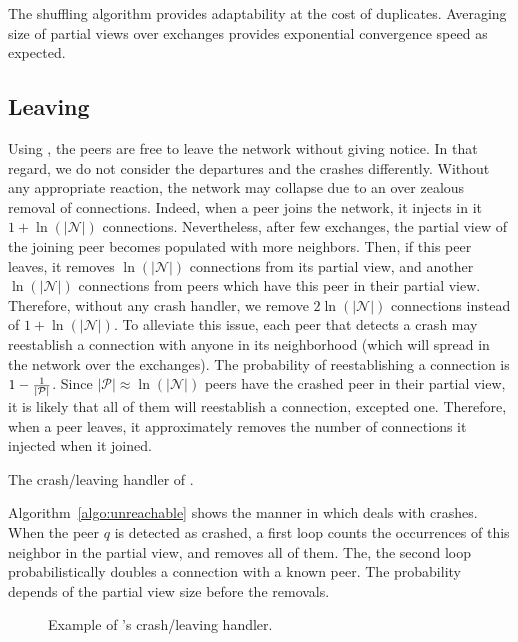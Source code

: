The shuffling algorithm provides adaptability at the cost of
duplicates. Averaging size of partial views over exchanges provides
exponential convergence speed as expected.


\subsection{Leaving}
\label{subsec:leaving}

Using \SPRAY{}, the peers are free to leave the network without giving
notice. In that regard, we do not consider the departures and the crashes
differently.  Without any appropriate reaction, the network may collapse due to
an over zealous removal of connections. Indeed, when a peer joins the network,
it injects in it $1+\ln(|\mathcal{N}|)$ connections. Nevertheless, after few
exchanges, the partial view of the joining peer becomes populated with more
neighbors. Then, if this peer leaves, it removes $\ln(|\mathcal{N}|)$
connections from its partial view, and another $\ln(|\mathcal{N}|)$ connections
from peers which have this peer in their partial view. Therefore, without any
crash handler, we remove $2\ln(|\mathcal{N}|)$ connections instead of
$1+\ln(|\mathcal{N}|)$. To alleviate this issue, each peer that detects a crash
may reestablish a connection with anyone in its neighborhood (which will spread
in the network over the exchanges). The probability of reestablishing a
connection is $1-{1\over{|\mathcal{P}|}}$. Since
${|\mathcal{P}|}\approx \ln(|\mathcal{N}|)$ peers have the crashed peer in
their partial view, it is likely that all of them will reestablish a
connection, excepted one. Therefore, when a peer leaves, it approximately
removes the number of connections it injected when it joined.

\begin{algorithm}[h]
  
  \caption{\label{algo:unreachable}The crash/leaving handler of \SPRAY{}.}
\end{algorithm}

Algorithm~\ref{algo:unreachable} shows the manner in which \SPRAY{} deals
with crashes. When the peer $q$ is detected as crashed, a first loop counts the
occurrences of this neighbor in the partial view, and removes all of them. The,
the second loop probabilistically doubles a connection with a known peer. The
probability depends of the partial view size before the removals.

\begin{figure*}
  \centering
  \hspace{10pt}
  \hspace{10pt}
  \caption{\label{fig:crashexample}Example of \SPRAY{}'s crash/leaving
    handler. }
\end{figure*}

